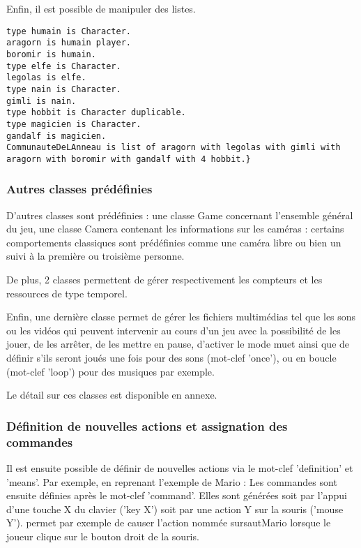 Enfin, il est possible de manipuler des listes.
\begin{lstlisting}[language=GameGrammar]
type humain is Character. 
aragorn is humain player.
boromir is humain.
type elfe is Character. 
legolas is elfe.
type nain is Character.
gimli is nain.
type hobbit is Character duplicable. 
type magicien is Character. 
gandalf is magicien.
CommunauteDeLAnneau is list of aragorn with legolas with gimli with aragorn with boromir with gandalf with 4 hobbit.}
\end{lstlisting}

\subsubsection{Autres classes prédéfinies}

D'autres classes sont prédéfinies : une classe Game concernant l'ensemble général du jeu, une classe Camera contenant les informations sur les caméras :
certains comportements classiques sont prédéfinies comme une caméra libre ou bien un suivi à la première ou troisième personne.

De plus, 2 classes permettent de gérer respectivement les compteurs et les ressources de type temporel.

Enfin, une dernière classe permet de gérer les fichiers multimédias tel que les sons ou les vidéos qui peuvent intervenir au cours d'un jeu 
avec la possibilité de les jouer, de les arrêter, de les mettre en pause, d'activer le mode muet ainsi que de définir s'ils seront joués 
une fois pour des sons (mot-clef 'once'), ou en boucle (mot-clef 'loop') pour des musiques par exemple.

Le détail sur ces classes est disponible en annexe.

\subsubsection{Définition de nouvelles actions et assignation des commandes}

Il est ensuite possible de définir de nouvelles actions via le mot-clef 'definition' et 'means'.
Par exemple, en reprenant l'exemple de Mario : 
Les commandes sont ensuite définies après le mot-clef 'command'. Elles sont générées soit par l'appui d'une touche X du clavier ('key X') soit par 
une action Y sur la souris ('mouse Y').
 permet par exemple de causer l'action nommée sursautMario lorsque le joueur clique sur le bouton droit de la souris.

